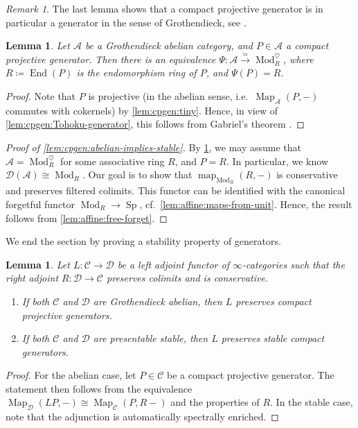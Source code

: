 \documentclass{article}
\theoremstyle{definition}
\theoremstyle{definition}
\theoremstyle{definition}
\theoremstyle{plain}
\newtheorem{lem}[defn]{Lemma}
\theoremstyle{plain}
\theoremstyle{plain}
\theoremstyle{plain}
\theoremstyle{plain}
\theoremstyle{plain}
\theoremstyle{plain}
\theoremstyle{plain}
\theoremstyle{remark}
\newtheorem{rmk}[defn]{Remark}
\theoremstyle{remark}
\theoremstyle{plain}
\theoremstyle{plain}
\theoremstyle{plain}
\theoremstyle{plain}
\theoremstyle{plain}
\newcommand{\Mod}[1]{\operatorname{Mod}_{#1}}
\newcommand{\ModDisc}[1]{\operatorname{Mod}_{#1}^{\heartsuit}}
\newcommand{\End}[1]{\operatorname{End}(#1)}
\newcommand{\Sp}{\operatorname{Sp}}
\newcommand{\Cat}[1]{\mathcal{#1}}
\newcommand{\Map}[3]{\operatorname{Map}_{#1}({#2}, {#3})} %
\newcommand{\map}[3]{\operatorname{map}_{#1}({#2}, {#3})} %
\begin{document}
\begin{rmk}
    The last lemma shows that a compact projective generator 
    is in particular a generator in the sense of Grothendieck, see 
    \cite[Proposition 1.9.1]{grothendieck1957tohoku}.
\end{rmk}

\begin{lem} \label{lem:cpgen:gabriel}
    Let $\Cat A$ be a Grothendieck abelian category, and $P \in \Cat A$ 
    a compact projective generator.
    Then there is an equivalence $\Psi \colon \Cat A \xrightarrow{\simeq} \ModDisc{R}$,
    where $R \coloneqq \End{P}$ is the endomorphism ring of $P$,
    and $\Psi(P) = R$.
\end{lem}
\begin{proof}
    Note that $P$ is projective (in the abelian sense, i.e.\ $\Map{\Cat A}{P}{-}$ commutes with cokernels)
    by \cref{lem:cpgen:tiny}.
    Hence, in view of \cref{lem:cpgen:Tohoku-generator}, this follows from Gabriel's theorem \cite[Corollaire V.1.1]{gabriel}.
\end{proof}

\begin{proof}[Proof of \cref{lem:cpgen:abelian-implies-stable}]
    By \cref{lem:cpgen:gabriel}, we may assume that $\Cat A = \ModDisc{R}$
    for some associative ring $R$, and $P = R$.
    In particular, we know $\Cat D(\Cat A) \cong \Mod{R}$.
    Our goal is to show that $\map{\Mod{R}}{R}{-}$ is conservative and preserves filtered colimits.
    This functor can be identified with the canonical forgetful functor $\Mod{R} \to \Sp$,
    cf.\ \cref{lem:affine:maps-from-unit}.
    Hence, the result follows from \cref{lem:affine:free-forget}.
\end{proof}

We end the section by proving a stability property of generators.
\begin{lem} \label{lem:cpgen:preservation}
    Let $L \colon \Cat C \to \Cat D$ be a left adjoint functor
    of $\infty$-categories
    such that the right adjoint $R \colon \Cat D \to \Cat C$ 
    preserves colimits and is conservative.
    \begin{enumerate}
        \item[(a)] If both $\Cat C$ and $\Cat D$ are Grothendieck abelian,
            then $L$ preserves compact projective generators.
        \item[(b)] If both $\Cat C$ and $\Cat D$ are presentable stable,
            then $L$ preserves stable compact generators.
    \end{enumerate}
\end{lem}
\begin{proof}
    For the abelian case, let $P \in \Cat C$ be a compact projective generator.
    The statement then follows from the equivalence $\Map{\Cat D}{LP}{-} \cong \Map{\Cat C}{P}{R-}$
    and the properties of $R$.
    In the stable case, note that the adjunction is automatically spectrally enriched.
\end{proof}


\end{document}
